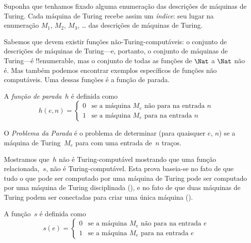 \documentclass[../../../include/open-logic-section]{subfiles}
\begin{document}

\begin{explain}
Suponha que tenhamos fixado alguma enumeração das descrições de
máquinas de Turing. Cada máquina de Turing recebe assim um
\emph{índice}: seu lugar na enumeração $M_1$, $M_2$, $M_3$, \dots{} das
descrições de máquinas de Turing.

Sabemos que devem existir funções não-Turing-computáveis: o conjunto
de descrições de máquinas de Turing---e, portanto, o conjunto de
máquinas de Turing---é !!{enumerable}, mas o conjunto de todas as
funções de $\Nat$ a $\Nat$ não é. Mas também podemos encontrar
exemplos específicos de funções não computáveis. Uma dessas funções é
a função de parada.
\end{explain}

\begin{defn}
 A \emph{função de parada}~$h$ é definida como
\[
h(e,n) =
\begin{cases}
  \text{0} & \text{se a máquina~$M_e$ não para na entrada $n$} \\
  \text{1} & \text{se a máquina~$M_e$ para na entrada $n$}
\end{cases}
\]
\end{defn}

\begin{defn}
O \emph{Problema da Parada} é o problema de determinar (para quaisquer
$e$, $n$) se a máquina de Turing~$M_e$ para com uma entrada de~$n$
traços.
\end{defn}

\begin{explain}
Mostramos que~$h$ não é Turing-computável mostrando que uma função
relacionada,~$s$, não é Turing-computável. Esta prova baseia-se no
fato de que tudo o que pode ser computado por uma máquina de Turing
pode ser computado por uma máquina de Turing disciplinada
(), e no fato de que duas máquinas de Turing podem
ser conectadas para criar uma única máquina ().
\end{explain}

\begin{defn} A função~$s$ é definida como
\[
s(e) =
\begin{cases}
  \text{0} & \text{se a máquina~$M_e$ não para na entrada $e$} \\
  \text{1} & \text{se a máquina~$M_e$ para na entrada $e$}
\end{cases}
\]
\end{defn}
\end{document}
